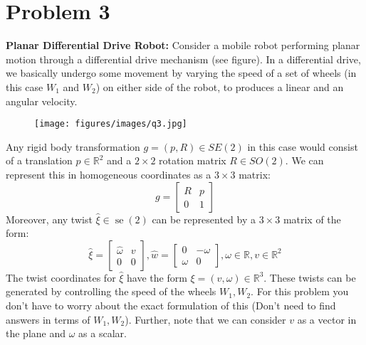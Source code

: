 \section*{Problem 3}
\setcounter{section}{3}
\setcounter{equation}{0}

\textbf{Planar Differential Drive Robot:}
Consider a mobile robot performing planar motion through a differential drive mechanism (see figure).
In a differential drive, we basically undergo some movement by varying the speed of a set of wheels (in this case \( W_{1} \) and \( W_{2} \)) on either side of the robot, to produces a linear and an angular velocity.
\begin{figure}[h]
    \centering
    \texttt{[image: figures/images/q3.jpg]}
\end{figure}

Any rigid body transformation \( g=(p, R) \in S E(2) \) in this case would consist of a translation \( p \in \mathbb{R}^{2} \) and a \( 2 \times 2 \) rotation matrix \( R \in S O(2) \).
We can represent this in homogeneous coordinates as a \( 3 \times 3 \) matrix:
\[
    g=\left[\begin{array}{ll}
            R & p \\
            0 & 1
        \end{array}\right]
\]
Moreover, any twist \( \hat{\xi} \in \operatorname{se}(2) \) can be represented by a \( 3 \times 3 \) matrix of the form:
\[
    \hat{\xi}=\left[\begin{array}{ll}
            \hat{\omega} & v \\
            0            & 0
        \end{array}\right], \hat{w}=\left[\begin{array}{cc}
            0      & -\omega \\
            \omega & 0
        \end{array}\right], \omega \in \mathbb{R}, v \in \mathbb{R}^{2}
\]
The twist coordinates for \( \hat{\xi} \) have the form \( \xi=(v, \omega) \in \mathbb{R}^{3} \).
These twists can be generated by controlling the speed of the wheels \( W_{1}, W_{2} \).
For this problem you don't have to worry about the exact formulation of this
(Don't need to find answers in terms of \( W_{1}, W_{2} \)).
Further, note that we can consider \( v \) as a vector in the plane and \( \omega \) as a scalar.

